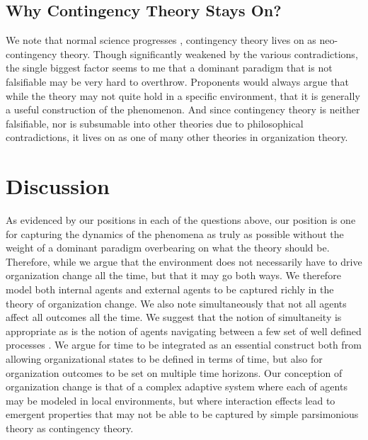 \documentclass[12pt]{article}
\begin{document}
\subsection{Why Contingency Theory Stays On?}
We note that normal science progresses \cite{Kuhn1970}, contingency theory lives on as neo-contingency theory. Though significantly weakened by the various contradictions, the single biggest factor seems to me that a dominant paradigm that is not falsifiable may be very hard to overthrow. Proponents would always argue that while the theory may not quite hold in a specific environment, that it is generally a useful construction of the phenomenon. And since contingency theory is neither falsifiable, nor is subsumable into other theories due to philosophical contradictions, it lives on as one of many other theories in organization theory.

\section{Discussion}
As evidenced by our positions in each of the questions above, our position is one for capturing the dynamics of the phenomena as truly as possible without the weight of a dominant paradigm overbearing on what the theory should be. Therefore, while we argue that the environment does not necessarily have to drive organization change all the time, but that it may go both ways. We therefore model both internal agents and external agents to be captured  richly in the theory of organization change. We also note  simultaneously  that not all agents affect all outcomes all the time. We suggest that the notion of simultaneity is appropriate \citep{Smith2011} as is the notion of agents navigating between a few set of well defined processes \citep{Siggelkow2002}. We argue for time to be integrated as an essential construct both from allowing organizational states to be defined in terms of time, but also for organization outcomes to be set on multiple time horizons. Our conception of organization change is that of a complex adaptive system where each of agents may be modeled in local environments, but where interaction effects lead to emergent properties that may not be able to be captured by simple parsimonious theory as contingency theory.


 

\end{document}
